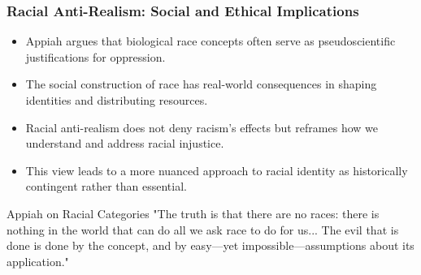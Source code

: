 \documentclass{beamer}
\begin{document}
	\begin{frame}
		\frametitle{Racial Anti-Realism: Social and Ethical Implications}
		
		\begin{itemize}
			\item Appiah argues that biological race concepts often serve as pseudoscientific justifications for oppression.
			\item The social construction of race has real-world consequences in shaping identities and distributing resources.
			\item Racial anti-realism does not deny racism's effects but reframes how we understand and address racial injustice.
			\item This view leads to a more nuanced approach to racial identity as historically contingent rather than essential.
		\end{itemize}
		
		\begin{exampleblock}{Appiah on Racial Categories}
			"The truth is that there are no races: there is nothing in the world that can do all we ask race to do for us... The evil that is done is done by the concept, and by easy—yet impossible—assumptions about its application."
		\end{exampleblock}
		
	\end{frame}
	
\end{document}
